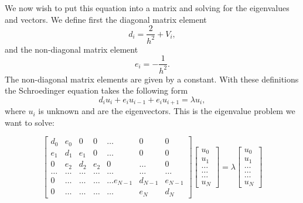 \documentclass[twocolumn]{article}
\begin{document}
We now wish to put this equation into a matrix and solving for the eigenvalues and vectors. 
We define first the diagonal matrix element
\begin{equation*}
   d_i=\frac{2}{h^2}+V_i,
\end{equation*}
and the non-diagonal matrix element
\begin{equation*}
   e_i=-\frac{1}{h^2}.
\end{equation*}
The non-diagonal matrix elements are given by a constant.
With these definitions the Schroedinger equation takes the following form
\begin{equation*}
d_iu_i+e_{i}u_{i-1}+e_{i}u_{i+1}  = \lambda u_i,
\end{equation*}
where $u_i$ is unknown and are the eigenvectors. This is the eigenvalue problem we want to solve:
\begingroup\makeatletter\def\f@size{8}\check@mathfonts
\def\maketag@@@#1{\hbox{\m@th\large\normalfont#1}}

\begin{equation*}
    \begin{bmatrix}d_0 & e_0 & 0   & 0    & \dots  &0     & 0 \\
                                e_1 & d_1 & e_1 & 0    & \dots  &0     &0 \\
                                0   & e_2 & d_2 & e_2  &0       &\dots & 0\\
                                \dots  & \dots & \dots & \dots  &\dots      &\dots & \dots\\
                                0   & \dots & \dots & \dots  &\dots  e_{N-1}     &d_{N-1} & e_{N-1}\\
                                0   & \dots & \dots & \dots  &\dots       &e_{N} & d_{N}
             \end{bmatrix}  \begin{bmatrix} u_{0} \\
                                                              u_{1} \\
                                                              \dots\\ \dots\\ \dots\\
                                                              u_{N}
             \end{bmatrix}=\lambda \begin{bmatrix} u_{0} \\
                                                              u_{1} \\
                                                              \dots\\ \dots\\ \dots\\
                                                              u_{N}
             \end{bmatrix} 
      \label{eq:sematrix}
\end{equation*}\endgroup
\end{document}
